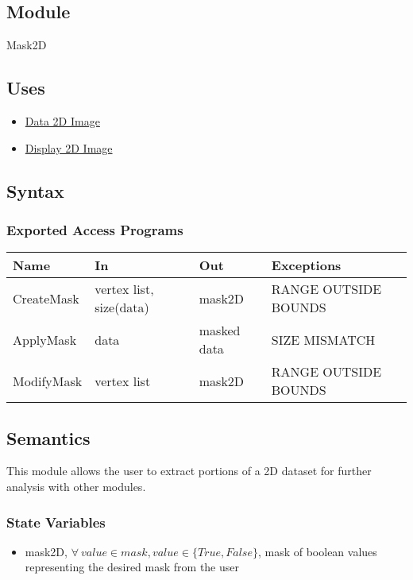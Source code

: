 \documentclass[12pt, titlepage]{article}
\begin{document}
\subsection{Module}

Mask2D

\subsection{Uses}
\begin{itemize}
    \item \hyperref[Mod:Image]{Data 2D Image}
    \item \hyperref[Mod:Disp2D]{Display 2D Image}
\end{itemize}

\subsection{Syntax}

\subsubsection{Exported Access Programs}

\begin{center}
    \begin{tabular}{p{3cm} p{4cm} p{4cm} p{3cm}}
        \hline
        \textbf{Name} & \textbf{In} & \textbf{Out} & \textbf{Exceptions} \\
        \hline
        CreateMask & vertex list, size(data) & mask2D & RANGE OUTSIDE BOUNDS \\
        ApplyMask & data & masked data & SIZE MISMATCH\\
        ModifyMask & vertex list & mask2D & RANGE OUTSIDE BOUNDS \\
        \hline
    \end{tabular}
\end{center}

\subsection{Semantics}
This module allows the user to extract portions of a 2D dataset for further
analysis with other modules.

\subsubsection{State Variables}
\begin{itemize}
    \item mask2D, $\forall\ value \in mask, value \in \{True,False\}$, mask of
    boolean values representing the desired mask from the user
\end{itemize}
\end{document}
